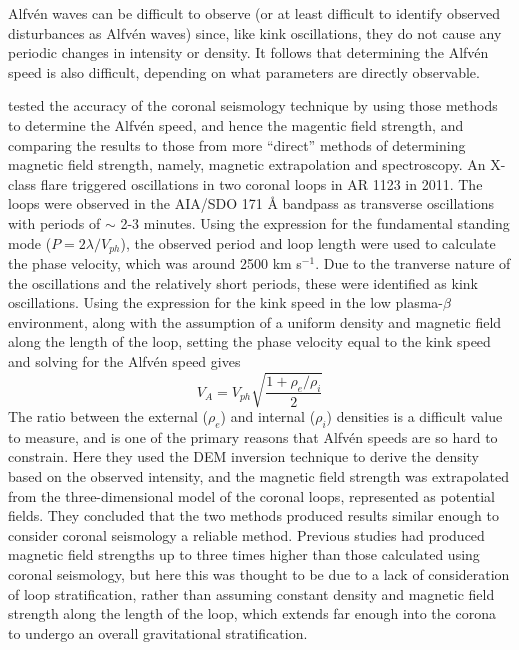 \documentclass[preprint2]{aastex}
\begin{document}
Alfv\'en waves can be difficult to observe (or at least difficult to
identify observed disturbances as Alfv\'en waves) since, like kink
oscillations, they do not cause any periodic changes in intensity or density.
It follows that determining the Alfv\'en speed is also difficult,
depending on what parameters are directly observable.

\cite{tor_2} tested the accuracy of the coronal seismology technique by
using those methods to determine the Alfv\'en speed, and hence the magentic
field strength, and comparing the
results to those from more ``direct'' methods of determining magnetic field
strength, namely, magnetic extrapolation and spectroscopy.
An X-class flare triggered oscillations in two coronal loops in AR
1123 in 2011.
The loops were observed in the AIA/SDO 171 \AA{} bandpass
as transverse oscillations with periods of
$\sim$ 2-3 minutes. Using the expression for the fundamental standing
mode ($P = 2\lambda/V_{ph}$), the observed period and loop length were
used to calculate the phase velocity, which was around 2500 km s$^{-1}$.
Due to the tranverse nature of the oscillations and the relatively short
periods, these were identified as kink oscillations. Using the expression
for the kink speed in the low plasma-$\beta$ environment, along with the
assumption of a uniform density and magnetic field along the length of
the loop, setting the phase velocity equal to the kink speed and solving
for the Alfv\'en speed gives
\begin{equation}
    V_{A} = V_{ph}\sqrt{\frac{1 + \rho_{e}/\rho_{i}}{2}}
\end{equation}
The ratio between the external ($\rho_{e}$) and internal ($\rho_{i}$)
densities is a difficult value to measure, and is one of the primary reasons
that Alfv\'en speeds are so hard to constrain.
Here they used the DEM inversion technique to derive the density based
on the observed intensity, and the magnetic field strength was extrapolated
from the three-dimensional model of the coronal loops, represented as
potential fields.
They concluded that the two methods produced results similar enough
to consider coronal seismology a reliable method. Previous studies
had produced magnetic field strengths up to three times higher than
those calculated using coronal seismology, but here this was thought
to be due to a lack of consideration of loop stratification,
rather than assuming constant density and magnetic field strength
along the length of the loop, which extends far enough into the
corona to undergo an overall gravitational stratification.
\end{document}
